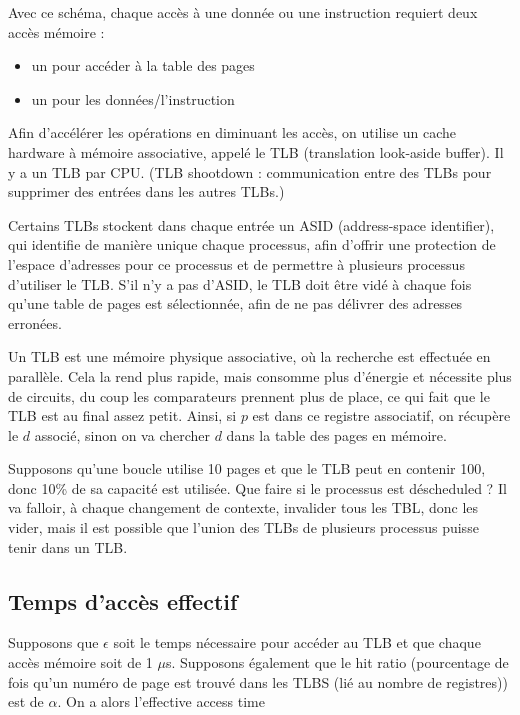 	Avec ce schéma, chaque accès à une donnée ou une instruction requiert deux accès mémoire :
	
	\begin{itemize}
		\item un pour accéder à la table des pages
		\item un pour les données/l'instruction
	\end{itemize}
	
	Afin d'accélérer les opérations en diminuant les accès, on utilise un cache hardware à mémoire associative, appelé le TLB (translation look-aside buffer). Il y a un TLB par CPU. (TLB shootdown : communication entre des TLBs pour supprimer des entrées dans les autres TLBs.)
	
	Certains TLBs stockent dans chaque entrée un ASID (address-space identifier), qui identifie de manière unique chaque processus, afin d'offrir une protection de l'espace d'adresses pour ce processus et de permettre à plusieurs processus d'utiliser le TLB. S'il n'y a pas d'ASID, le TLB doit être vidé à chaque fois qu'une table de pages est sélectionnée, afin de ne pas délivrer des adresses erronées.
	
	Un TLB est une mémoire physique associative, où la recherche est effectuée en parallèle. Cela la rend plus rapide, mais consomme plus d'énergie et nécessite plus de circuits, du coup les comparateurs prennent plus de place, ce qui fait que le TLB est au final assez petit. Ainsi, si $p$ est dans ce registre associatif, on récupère le $d$ associé, sinon on va chercher $d$ dans la table des pages en mémoire.
	
	
	Supposons qu'une boucle utilise 10 pages et que le TLB peut en contenir 100, donc 10\% de sa capacité est utilisée. Que faire si le processus est déscheduled ? Il va falloir, à chaque changement de contexte, invalider tous les TBL, donc les vider, mais il est possible que l'union des TLBs de plusieurs processus puisse tenir dans un TLB.
	
	
	\subsection{Temps d'accès effectif}
	
	Supposons que $\epsilon$ soit le temps nécessaire pour accéder au TLB et que chaque accès mémoire soit de 1 $\mu$s. Supposons également que le hit ratio (pourcentage de fois qu'un numéro de page est trouvé dans les TLBS (lié au nombre de registres)) est de $\alpha$. On a alors l'effective access time
	
